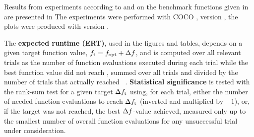 \documentclass[sigconf]{acmart}
\begin{document}
Results from experiments according to \cite{hansen2016exp} and \cite{hansen2022perfass} on the
benchmark functions given in \cite{varelas2020benchmarking} are
presented in
The experiments were performed with COCO \cite{hansen2020cocoplat}, version
\change{\version}, the plots were produced with version \change{\version}.

The \textbf{expected runtime (ERT)}, used in the figures and tables,
depends on a given target function value, $f_\mathrm{t}=f_\mathrm{opt}+\Delta f$, and is
computed over all relevant trials as the number of function
evaluations executed during each trial while the best function value
did not reach \ftarget, summed over all trials and divided by the
number of trials that actually reached \ftarget\
\cite{hansen2012exp,price1997dev}. 
\textbf{Statistical significance} is tested with the rank-sum test for a given
target $\Delta f_\mathrm{t}$ using, for each trial,
either the number of needed function evaluations to reach
$\Delta f_\mathrm{t}$ (inverted and multiplied by $-1$), or, if the target
was not reached, the best $\Delta f$-value achieved, measured only up to
the smallest number of overall function evaluations for any
unsuccessful trial under consideration.
\end{document}
